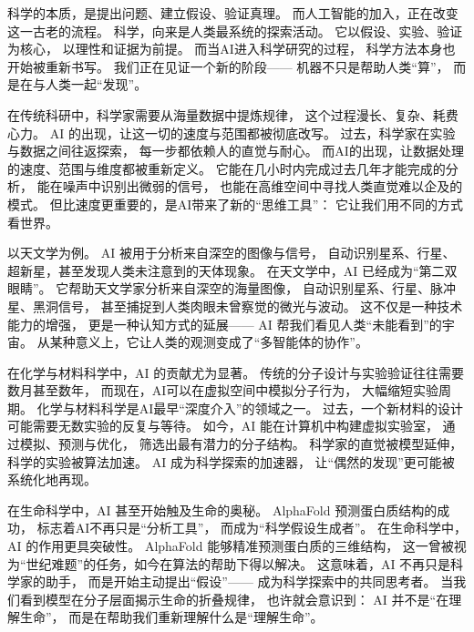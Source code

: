 科学的本质，是提出问题、建立假设、验证真理。  
而人工智能的加入，正在改变这一古老的流程。  
科学，向来是人类最系统的探索活动。  
它以假设、实验、验证为核心，  
以理性和证据为前提。  
而当AI进入科学研究的过程，  
科学方法本身也开始被重新书写。  
我们正在见证一个新的阶段——  
机器不只是帮助人类“算”，  
而是在与人类一起“发现”。

在传统科研中，科学家需要从海量数据中提炼规律，  
这个过程漫长、复杂、耗费心力。  
AI 的出现，让这一切的速度与范围都被彻底改写。  
过去，科学家在实验与数据之间往返探索，  
每一步都依赖人的直觉与耐心。  
而AI的出现，让数据处理的速度、范围与维度都被重新定义。  
它能在几小时内完成过去几年才能完成的分析，  
能在噪声中识别出微弱的信号，  
也能在高维空间中寻找人类直觉难以企及的模式。  
但比速度更重要的，是AI带来了新的“思维工具”：  
它让我们用不同的方式看世界。

以天文学为例。  
AI 被用于分析来自深空的图像与信号，  
自动识别星系、行星、超新星，甚至发现人类未注意到的天体现象。  
在天文学中，AI 已经成为“第二双眼睛”。  
它帮助天文学家分析来自深空的海量图像，  
自动识别星系、行星、脉冲星、黑洞信号，  
甚至捕捉到人类肉眼未曾察觉的微光与波动。  
这不仅是一种技术能力的增强，  
更是一种认知方式的延展——  
AI 帮我们看见人类“未能看到”的宇宙。  
从某种意义上，它让人类的观测变成了“多智能体的协作”。

在化学与材料科学中，AI 的贡献尤为显著。  
传统的分子设计与实验验证往往需要数月甚至数年，  
而现在，AI可以在虚拟空间中模拟分子行为，  
大幅缩短实验周期。  
化学与材料科学是AI最早“深度介入”的领域之一。  
过去，一个新材料的设计可能需要无数实验的反复与等待。  
如今，AI 能在计算机中构建虚拟实验室，  
通过模拟、预测与优化，  
筛选出最有潜力的分子结构。  
科学家的直觉被模型延伸，  
科学的实验被算法加速。  
AI 成为科学探索的加速器，  
让“偶然的发现”更可能被系统化地再现。

在生命科学中，AI 甚至开始触及生命的奥秘。  
AlphaFold 预测蛋白质结构的成功，  
标志着AI不再只是“分析工具”，  
而成为“科学假设生成者”。  
在生命科学中，AI 的作用更具突破性。  
AlphaFold 能够精准预测蛋白质的三维结构，  
这一曾被视为“世纪难题”的任务，如今在算法的帮助下得以解决。  
这意味着，AI 不再只是科学家的助手，  
而是开始主动提出“假设”——  
成为科学探索中的共同思考者。  
当我们看到模型在分子层面揭示生命的折叠规律，  
也许就会意识到：  
AI 并不是“在理解生命”，  
而是在帮助我们重新理解什么是“理解生命”。

